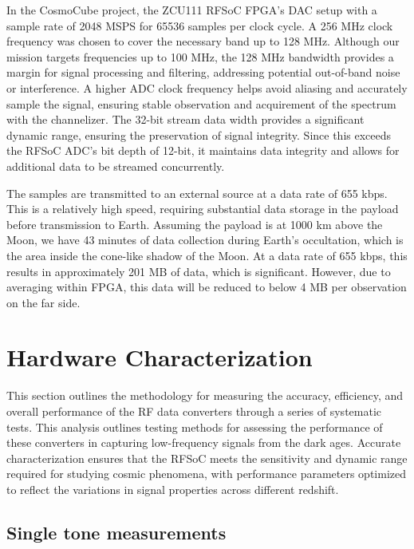 \documentclass[fleqn,usenatbib]{rasti}
\begin{document}
In the CosmoCube project, the ZCU111 RFSoC FPGA's DAC setup with a sample rate of 2048 MSPS for 65536 samples per clock cycle. A 256 MHz clock frequency was chosen to cover the necessary band up to 128 MHz. Although our mission targets frequencies up to 100 MHz, the 128 MHz bandwidth provides a margin for signal processing and filtering, addressing potential out-of-band noise or interference. A higher ADC clock frequency helps avoid aliasing and accurately sample the signal, ensuring stable observation and acquirement of the spectrum with the channelizer. The 32-bit stream data width provides a significant dynamic range, ensuring the preservation of signal integrity. Since this exceeds the RFSoC ADC's bit depth of 12-bit, it maintains data integrity and allows for additional data to be streamed concurrently.

The samples are transmitted to an external source at a data rate of 655 kbps. This is a relatively high speed, requiring substantial data storage in the payload before transmission to Earth. Assuming the payload is at 1000 km above the Moon, we have 43 minutes of data collection during Earth's occultation, which is the area inside the cone-like shadow of the Moon. At a data rate of 655 kbps, this results in approximately 201 MB of data, which is significant. However, due to averaging within FPGA, this data will be reduced to below 4 MB per observation on the far side.

\section{Hardware Characterization}

This section outlines the methodology for measuring the accuracy, efficiency, and overall performance of the RF data converters through a series of systematic tests. This analysis outlines testing methods for assessing the performance of these converters in capturing low-frequency signals from the dark ages. Accurate characterization ensures that the RFSoC meets the sensitivity and dynamic range required for studying cosmic phenomena, with performance parameters optimized to reflect the variations in signal properties across different redshift.

\subsection{Single tone measurements}
\label{sec:singleTone}
\end{document}
